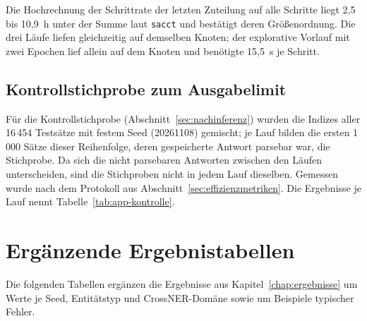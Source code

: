 Die Hochrechnung der Schrittrate der letzten Zuteilung auf alle Schritte
liegt 2,5 bis 10,9~h unter der Summe laut \texttt{sacct} und bestätigt
deren Größenordnung.
Die drei Läufe liefen gleichzeitig auf demselben Knoten; der explorative
Vorlauf mit zwei Epochen lief allein auf dem Knoten und benötigte
15,5~s je Schritt.


\subsection{Kontrollstichprobe zum Ausgabelimit}
\label{app:kontrollstichprobe}

Für die Kontrollstichprobe (Abschnitt~\ref{sec:nachinferenz}) wurden die
Indizes aller 16\,454 Testsätze mit festem Seed (20261108)
gemischt; je Lauf bilden die ersten 1\,000 Sätze dieser Reihenfolge,
deren gespeicherte Antwort parsebar war, die Stichprobe.
Da sich die nicht parsebaren Antworten zwischen den Läufen
unterscheiden, sind die Stichproben nicht in jedem Lauf dieselben.
Gemessen wurde nach dem Protokoll aus
Abschnitt~\ref{sec:effizienzmetriken}.
Die Ergebnisse je Lauf nennt Tabelle~\ref{tab:app-kontrolle}.

\FloatBarrier
\section{Ergänzende Ergebnistabellen}
\label{app:ergebnistabellen}


Die folgenden Tabellen ergänzen die Ergebnisse aus
Kapitel~\ref{chap:ergebnisse} um Werte je Seed, Entitätstyp und
CrossNER-Domäne sowie um Beispiele typischer Fehler.

\begin{table}[ht]
  \centering
  \footnotesize
  \caption[Mikro-F$_1$ je Seed und Validierungs-F$_1$ der Checkpoints]{Mikro-F$_1$ (strikt, in Punkten) der einzelnen Seeds auf dem
  MultiNERD-Testsplit (Hauptläufe mit 256 Ausgabetokens) sowie
  Validierungs-F$_1$ des gewählten Checkpoints mit Epoche in Klammern
  (Encoder: vollständiger Validierungssplit; QLoRA: generative
  Validierung auf 200 Sätzen).}
  \label{tab:app-seeds}
  
\end{table}

\begin{table}[ht]
  \centering
  \footnotesize
  \caption[Nachinferenz mit 1\,024 Tokens je Seed]{Nachinferenz der
  abgeschnittenen Antworten mit 1\,024 Ausgabetokens je Seed: Mikro-F$_1$
  bei 256 und 1\,024 Tokens, Differenz, Zahl der neu erzeugten und der
  weiterhin abgeschnittenen Antworten sowie Zahl der Antworten, deren
  erste 256 Tokens die gespeicherte Antwort reproduzieren.}
  \label{tab:app-limit-seeds}
  \setlength{\tabcolsep}{4pt}
  
\end{table}

